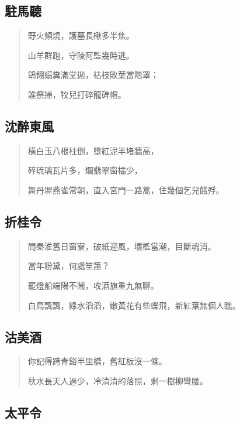 \documentclass[UTF8]{ctexart}
\begin{document}
\subsection{駐馬聽}

\begin{verse}
    野火頻燒，護墓長楸多半焦。
    
    山羊群跑，守陵阿監幾時逃。
    
    鴿翎蝠糞滿堂拋，枯枝敗葉當階罩；
    
    誰祭掃，牧兒打碎龍碑帽。
\end{verse}

\subsection{沈醉東風}

\begin{verse}
    橫白玉八根柱倒，墮紅泥半堵牆高，
    
    碎琉璃瓦片多，爛翡翠窗櫺少，
    
    舞丹墀燕雀常朝，直入宮門一路蒿，住幾個乞兒餓殍。
\end{verse}

\subsection{折桂令}

\begin{verse}
    問秦淮舊日窗寮，破紙迎風，壞檻當潮，目斷魂消。
    
    當年粉黛，何處笙簫？
    
    罷燈船端陽不鬧，收酒旗重九無聊。
    
    白鳥飄飄，綠水滔滔，嫩黃花有些蝶飛，新紅葉無個人瞧。
\end{verse}

\subsection{沽美酒}

\begin{verse}
    你記得跨青谿半里橋，舊紅板沒一條。
    
    秋水長天人過少，冷清清的落照，剩一樹柳彎腰。
\end{verse}

\subsection{太平令}
\end{document}
